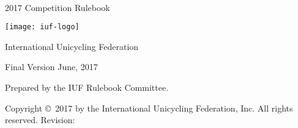 \begin{titlepage}
\centering
\ \\
\vspace{5cm}
{\Huge 2017 Competition Rulebook}
\vspace{5mm}

\texttt{[image: iuf-logo]}

\vspace{5mm}
{\huge International Unicycling Federation}

\vspace{5mm}
{\Large Final Version \quad June, 2017}

\vspace{45mm}
Prepared by the IUF Rulebook Committee.

\vspace{5mm}
{\small Copyright \copyright\ 2017 by the International Unicycling Federation, Inc. All rights reserved.}
\small{Revision: \href{https://github.com/iuf/rulebook/commit/\gitHash}{\gitAbbrevHash} \ \gitCommitterDate}

\end{titlepage}

